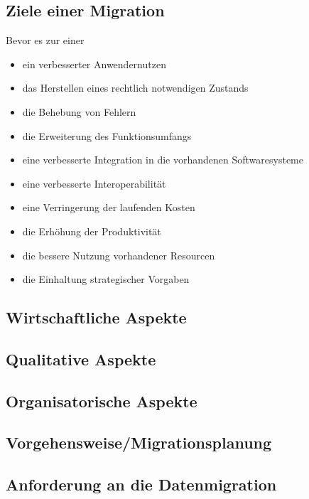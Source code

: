 \subsection{Ziele einer Migration}
Bevor es zur einer 
\begin{itemize}
  \item ein verbesserter Anwendernutzen
  \item das Herstellen eines rechtlich notwendigen Zustands
  \item die Behebung von Fehlern
  \item die Erweiterung des Funktionsumfangs
  \item eine verbesserte Integration in die vorhandenen Softwaresysteme
  \item eine verbesserte Interoperabilität
  \item eine Verringerung der laufenden Kosten
  \item die Erhöhung der Produktivität
  \item die bessere Nutzung vorhandener Resourcen
  \item die Einhaltung strategischer Vorgaben
\end{itemize}
\subsection{Wirtschaftliche Aspekte}
\subsection{Qualitative Aspekte}
\subsection{Organisatorische Aspekte}
\subsection{Vorgehensweise/Migrationsplanung}
\subsection{Anforderung an die Datenmigration}




